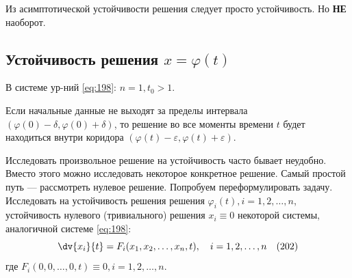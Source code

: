 Из асимптотической устойчивости решения следует просто устойчивость. Но \textbf{НЕ} наоборот.

\subsection*{Устойчивость решения $x=\varphi(t)$}
В системе ур-ний \eqref{eq:198}: $n=1, t_0 > 1$.

\begin{center}
\end{center}

Если начальные данные не выходят за пределы интервала $(\varphi(0)-\delta, \varphi(0)+\delta)$, то решение во все моменты времени $t$ будет находиться внутри коридора $(\varphi(t)-\varepsilon, \varphi(t)+\varepsilon)$.

Исследовать произвольное решение на устойчивость часто бывает неудобно. Вместо этого можно исследовать некоторое конкретное решение. Самый простой путь --- рассмотреть нулевое решение. Попробуем переформулировать задачу.
Исследовать на устойчивость решения решения $\varphi_i(t), i=1,2,\dots,n$, устойчивость нулевого (тривиального) решения $x_i \equiv 0$ некоторой системы, аналогичной системе \eqref{eq:198}:
\begin{equation} \label{eq:202}
	\dv{x_i}{t} = F_i(x_1, x_2, \dots, x_n, t), \quad i=1,2,\dots,n \quad (202)
\end{equation}
где $F_i(0, 0, \dots, 0, t) \equiv 0, i=1,2,\dots,n$.

